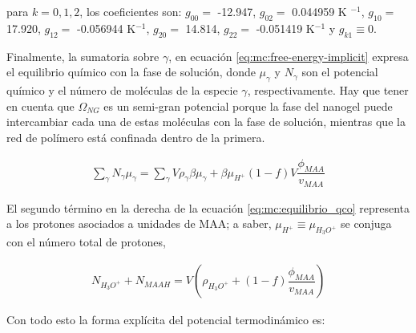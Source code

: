	
	\noindent para  $k=0,1,2$, los coeficientes son: $g_{00}=$ -12.947, $g_{02}=$ 0.044959 K $^{-1}$, $g_{10}=$  17.920, $g_{12}=$ -0.056944 K$^{-1}$, $g_{20}=$ 14.814, $g_{22}=$ -0.051419 K$^{-1}$  y $g_{k1}\equiv 0$. \cite{afroze2000}
	
	
	
	
	Finalmente, la sumatoria sobre $\gamma$, en ecuaci\'on \ref{eq:mc:free-energy-implicit} expresa el equilibrio qu\'imico con la fase de soluci\'on, donde $\mu_\gamma$ y $N_\gamma$ son el potencial qu\'imico y el n\'umero de mol\'eculas de la especie $\gamma$, respectivamente.
	Hay que tener en cuenta que $\Omega_{NG}$ es un semi-gran potencial porque la fase del nanogel puede intercambiar cada una de estas mol\'eculas con la fase de soluci\'on, mientras que la red de pol\'imero est\'a confinada dentro de la primera.
	
	
	\begin{align}
		\sum_\gamma N_\gamma \mu_\gamma = \sum_{\gamma }V{\rho_\gamma\beta\mu_\gamma}
		+ \beta\mu_{H^+}(1-f)V\dfrac{\phi_{MAA}}{v_{MAA}}
		\label{eq:mc:equilibrio_qco}
	\end{align}
	
	El segundo t\'ermino en la derecha de la ecuaci\'on \ref{eq:mc:equilibrio_qco} representa a los protones asociados a unidades de MAA;
	a saber, $\mu_{H^+}\equiv\mu_{H_3O^+}$ se conjuga con el n\'umero total de protones,
	
	\begin{align}
		N_{H_3O^+}+N_{MAAH}=V\left(\rho_{H_3O^+}+(1-f)\dfrac{\phi_{MAA}}{v_{MAA}}\right)
		\label{eq:mc:equilibrio}
	\end{align}
	
	
	
	Con todo esto la forma expl\'icita del potencial termodin\'amico es:
	
	
	
